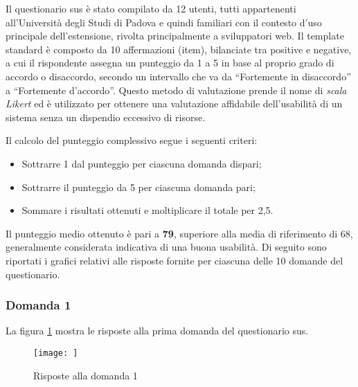 \par Il questionario \gls{sus} è stato compilato da 12 utenti, tutti appartenenti all’Università degli Studi di Padova e quindi familiari con il contesto d’uso principale dell’estensione, rivolta principalmente a sviluppatori web. Il template standard è composto da 10 affermazioni (item), bilanciate tra positive e negative, a cui il rispondente assegna un punteggio da 1 a 5 in base al proprio grado di accordo o disaccordo, secondo un intervallo che va da “Fortemente in disaccordo” a “Fortemente d’accordo”. Questo metodo di valutazione prende il nome di \textit{scala Likert} ed è utilizzato per ottenere una valutazione affidabile dell’usabilità di un sistema senza un dispendio eccessivo di risorse.

\vspace{10pt}
\par\noindent Il calcolo del punteggio complessivo segue i seguenti criteri:
\begin{itemize}
  \item Sottrarre 1 dal punteggio per ciascuna domanda dispari;
  \item Sottrarre il punteggio da 5 per ciascuna domanda pari;
  \item Sommare i risultati ottenuti e moltiplicare il totale per 2,5. 
\end{itemize}

\vspace{5pt}
\par\noindent Il punteggio medio ottenuto è pari a \textbf{79}, superiore alla media di riferimento di 68, generalmente considerata indicativa di una buona usabilità. Di seguito sono riportati i grafici relativi alle risposte fornite per ciascuna delle 10 domande del questionario.

\subsubsection*{Domanda 1}

\vspace{5pt}
\begin{minipage}{\textwidth}
  \par\noindent La figura \ref{fig:sus_q1} mostra le risposte alla prima domanda del questionario \gls{sus}.
  \begin{figure}[H]
    \centering
    \texttt{[image: ]}
    \caption{Risposte alla domanda 1}
    \label{fig:sus_q1}
  \end{figure}
\end{minipage}

